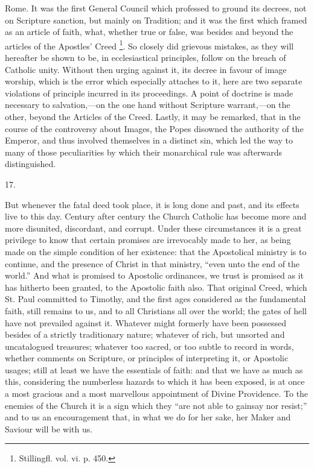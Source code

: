 Rome. It was the first General Council which professed to ground its
decrees, not on Scripture sanction, but mainly on Tradition; and it
was the first which framed as an article of faith, what, whether true
or false, was besides and beyond the articles of the Apostles' Creed \footnote{Stillingfl. vol. vi. p. 450.}. So closely did grievous mistakes, as they will hereafter be
shown to be, in ecclesiastical principles, follow on the breach of
Catholic unity. Without then urging against it, its decree in favour
of image worship, which is the error which especially attaches to it,
here are two separate violations of principle incurred in its
proceedings. A point of doctrine is made necessary to salvation,—on
the one hand without Scripture warrant,—on the other, beyond the
Articles of the Creed. Lastly, it may be remarked, that in the course
of the controversy about Images, the Popes disowned the authority of
the Emperor, and thus involved themselves in a distinct sin,
which led the way to many of those peculiarities by which their
monarchical rule was afterwards distinguished.

17.

But whenever the fatal deed took place, it is long done and past,
and its effects live to this day. Century after century the Church
Catholic has become more and more disunited, discordant, and corrupt.
Under these circumstances it is a great privilege to know that certain
promises are irrevocably made to her, as being made on the simple
condition of her existence: that the Apostolical ministry is to
continue, and the presence of Christ in that ministry, ``even unto
the end of the world.'' And what is promised to Apostolic
ordinances, we trust is promised as it has hitherto been granted, to
the Apostolic faith also. That original Creed, which St. Paul
committed to Timothy, and the first ages considered as the fundamental
faith, still remains to us, and to all Christians all over the world;
the gates of hell have not prevailed against it. Whatever might
formerly have been possessed besides of a strictly traditionary
nature; whatever of rich, but unsorted and uncatalogued treasures;
whatever too sacred, or too subtle to record in words, whether
comments on Scripture, or principles of interpreting it, or Apostolic
usages; still at least we have the essentials of faith: and that we
have as much as this, considering the numberless hazards to which it
has been exposed, is at once a most gracious and a most marvellous
appointment of Divine Providence. To the enemies of the Church it is a
sign which they ``are not able to gainsay nor resist;'' and to
us an encouragement that, in what we do for her sake, her Maker and
Saviour will be with us.

